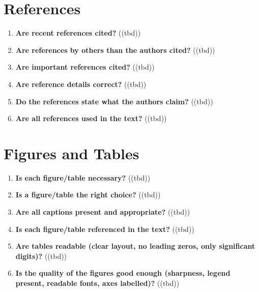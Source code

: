 \section{References}\label{sec:references}
\begin{enumerate}[resume]
    \item \textbf{Are recent references cited?} 	\textcolor{HighlightColor}{((tbd))}
    \item \textbf{Are references by others than the authors cited?} 	\textcolor{HighlightColor}{((tbd))}
    \item \textbf{Are important references cited?} 	\textcolor{HighlightColor}{((tbd))}
    \item \textbf{Are reference details correct?} 	\textcolor{HighlightColor}{((tbd))}
    \item \textbf{Do the references state what the authors claim?} 	\textcolor{HighlightColor}{((tbd))}
    \item \textbf{Are all references used in the text?} 	\textcolor{HighlightColor}{((tbd))}
\end{enumerate}

\section{Figures and Tables}\label{sec:figures}
\begin{enumerate}[resume]
    \item \textbf{Is each figure/table necessary?} 	\textcolor{HighlightColor}{((tbd))}
    \item \textbf{Is a figure/table the right choice?} 	\textcolor{HighlightColor}{((tbd))}
    \item \textbf{Are all captions present and appropriate?} 	\textcolor{HighlightColor}{((tbd))}
    \item \textbf{Is each figure/table referenced in the text?} 	\textcolor{HighlightColor}{((tbd))}
    \item \textbf{Are tables readable (clear layout, no leading zeros, only significant digits)?} 	\textcolor{HighlightColor}{((tbd))}
    \item \textbf{Is the quality of the figures good enough (sharpness, legend present, readable fonts, axes labelled)?} 	\textcolor{HighlightColor}{((tbd))}
\end{enumerate}

